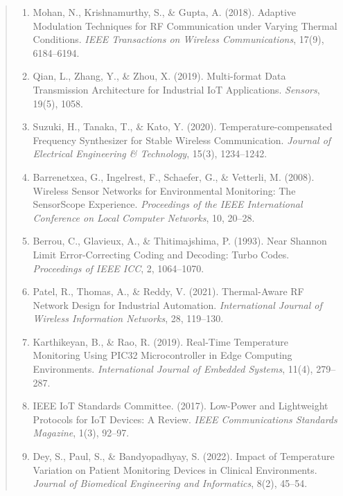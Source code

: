 \documentclass[12pt]{report}
\begin{document}
\begin{quote}  %

\begin{enumerate}

\item Mohan, N., Krishnamurthy, S., \& Gupta, A. (2018). Adaptive Modulation Techniques for RF Communication under Varying Thermal Conditions. \textit{IEEE Transactions on Wireless Communications}, 17(9), 6184–6194.

\item Qian, L., Zhang, Y., \& Zhou, X. (2019). Multi-format Data Transmission Architecture for Industrial IoT Applications. \textit{Sensors}, 19(5), 1058.

\item Suzuki, H., Tanaka, T., \& Kato, Y. (2020). Temperature-compensated Frequency Synthesizer for Stable Wireless Communication. \textit{Journal of Electrical Engineering \& Technology}, 15(3), 1234–1242.

\item Barrenetxea, G., Ingelrest, F., Schaefer, G., \& Vetterli, M. (2008). Wireless Sensor Networks for Environmental Monitoring: The SensorScope Experience. \textit{Proceedings of the IEEE International Conference on Local Computer Networks}, 10, 20–28.

\item Berrou, C., Glavieux, A., \& Thitimajshima, P. (1993). Near Shannon Limit Error-Correcting Coding and Decoding: Turbo Codes. \textit{Proceedings of IEEE ICC}, 2, 1064–1070.

\item Patel, R., Thomas, A., \& Reddy, V. (2021). Thermal-Aware RF Network Design for Industrial Automation. \textit{International Journal of Wireless Information Networks}, 28, 119–130.

\item Karthikeyan, B., \& Rao, R. (2019). Real-Time Temperature Monitoring Using PIC32 Microcontroller in Edge Computing Environments. \textit{International Journal of Embedded Systems}, 11(4), 279–287.

\item IEEE IoT Standards Committee. (2017). Low-Power and Lightweight Protocols for IoT Devices: A Review. \textit{IEEE Communications Standards Magazine}, 1(3), 92–97.

\item Dey, S., Paul, S., \& Bandyopadhyay, S. (2022). Impact of Temperature Variation on Patient Monitoring Devices in Clinical Environments. \textit{Journal of Biomedical Engineering and Informatics}, 8(2), 45–54.


\end{enumerate}
\end{quote}
\end{document}
